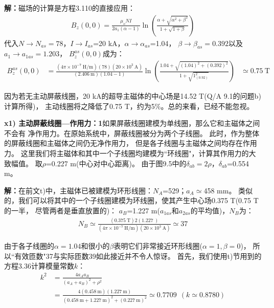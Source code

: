 \textbf{解：}磁场的计算是方程3.110的直接应用：
\begin{align*}%
B_z(0,0)=\frac{\mu_oNI}{2a_1(\alpha-1)}\ln(\frac{\alpha+\sqrt{\alpha^2+\beta^2}}{1+\sqrt{1+\beta}}) \tag{3.110}
\end{align*}
代入$N\rightarrow N_{as}=78$，$I\rightarrow I_{as}$=20 kA，$\alpha\rightarrow \alpha_{as}$=1.04，
$\beta\rightarrow \beta_{as}=0.392$以及$a_1\rightarrow a_{1as}=1.203$，
$B_z^{as}(0,0)$成为：
\begin{align*}%
B_z^{as}(0,0)&=\frac{(4\pi\times 10^{-7}\ \mathrm{H/m})(78)(20\times 10^3\ \mathrm{A})}{(2.406\ \mathrm{m})(1.04-1)}\ln(\frac{1.04+\sqrt{(1.04)^2+(0.392)^2}}{1+\sqrt{1_(0.92)^2}})
&\simeq 0.75\ \mathrm{T}
\end{align*}

因为若无主动屏蔽线圈，20 kA的超导主磁体的中心场是14.52 T(Q/A 9.1的问题b)计算所得)，
主动线圈将之降低了0.75 T，约为5\%。总的来看，已经不能忽视。

\textbf{x1) 主动屏蔽线圈---作用力：1}\qquad 如果屏蔽线圈建模为单线圈，那么它和主磁体之间不会有
净作用力。在原始系统中，屏蔽线圈被分为两个子线圈。
此时，作为整体的屏蔽线圈和主磁体之间仍无净作用力，
但是各子线圈与主磁体之间均存在作用力。
这里我们将主磁体和其中一个子线圈均建模为``环线圈"，计算其作用力的大致幅值。
取$\rho$=0.227 m(中心对中心距离)。
由于图9.5中的$\delta_{ab}=2\rho$，$\delta_{ab}$=0.554 m。

\textbf{解：}在前文t)中，主磁体已被建模为环形线圈：$N_A$=529；$a_A\simeq$458 mm。
类似的，我们可以将其中的一个子线圈建模为环线圈，使其产生中心场0.375 T(0.75 T的一半，
尽管两者是垂直放置的)：
$a_B$=1.227 m($a_{1as}$和$a_{2as}$的平均值)，$N_B$为：
\begin{align*}%
N_B\simeq\frac{(0.375\ \mathrm{T})2(1.227\ \mathrm{})}{(4\pi\times 10^{-7}\ \mathrm{H/m})(20\times 10^3\ \mathrm{A})}\simeq 37
\end{align*}

由于各子线圈的$\alpha=1.04$和很小的$\beta$表明它们非常接近环形线圈($\alpha=1,\beta=0$)，
所以``有效匝数"37与实际匝数39如此接近并不令人惊讶。
首先，我们使用t)节用到的方程3.36计算模量常数$k$：
\begin{align*}%
k^2&=\frac{4a_Aa_B}{(a_A+a_B)^2+\rho^2}\\ \tag{3.36}
&=\frac{4(0.458\ \mathrm{m})(1.227\ \mathrm{m})}{(0.458\ \mathrm{m+1.227\ \mathrm{m}})^2+(0.227\ \mathrm{m})^2}\simeq 0.7709\   \ (k\simeq 0.8780)
\end{align*}

